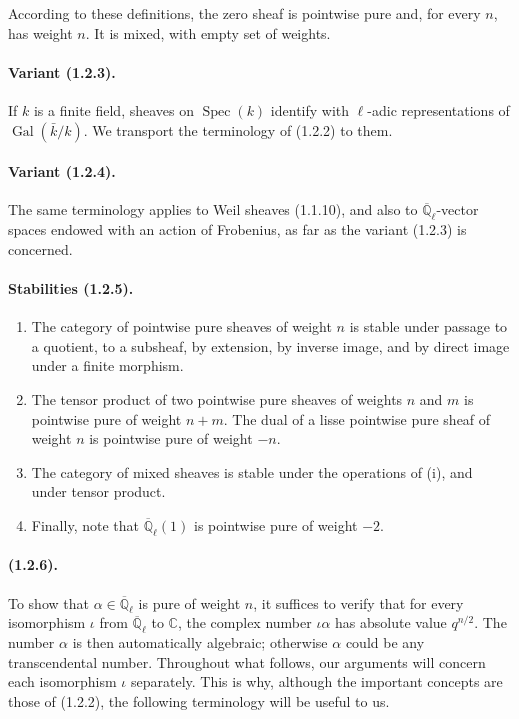 \documentclass[11pt]{article}
\theoremstyle{remark}
\newcommand{\Qlb}{\overline{\mathbb{Q}}_\ell}
\newcommand{\CC}{\mathbb{C}}
\newcommand{\Spec}{\operatorname{Spec}}
\newcommand{\Gal}{\operatorname{Gal}}
\begin{document}
According to these definitions, the zero sheaf is pointwise pure and, for every $n$, has weight $n$. It is mixed, with empty set of weights.

\paragraph{Variant (1.2.3).} If $k$ is a finite field, sheaves on $\Spec(k)$ identify with $\ell$-adic representations of $\Gal(\bar k/k)$. We transport the terminology of (1.2.2) to them.

\paragraph{Variant (1.2.4).} The same terminology applies to Weil sheaves (1.1.10), and also to $\Qlb$-vector spaces endowed with an action of Frobenius, as far as the variant (1.2.3) is concerned.

\paragraph{Stabilities (1.2.5).}
\begin{enumerate}[label=(\roman*)]
\item The category of pointwise pure sheaves of weight $n$ is stable under passage to a quotient, to a subsheaf, by extension, by inverse image, and by direct image under a finite morphism.
\item The tensor product of two pointwise pure sheaves of weights $n$ and $m$ is pointwise pure of weight $n+m$. The dual of a lisse pointwise pure sheaf of weight $n$ is pointwise pure of weight $-n$.
\item The category of mixed sheaves is stable under the operations of (i), and under tensor product.
\item Finally, note that $\Qlb(1)$ is pointwise pure of weight $-2$.
\end{enumerate}

\paragraph{(1.2.6).} To show that $\alpha\in\Qlb$ is pure of weight $n$, it suffices to verify that for every isomorphism $\iota$ from $\Qlb$ to $\CC$, the complex number $\iota\alpha$ has absolute value $q^{n/2}$. The number $\alpha$ is then automatically algebraic; otherwise $\alpha$ could be any transcendental number. Throughout what follows, our arguments will concern each isomorphism $\iota$ separately. This is why, although the important concepts are those of (1.2.2), the following terminology will be useful to us.
\end{document}
